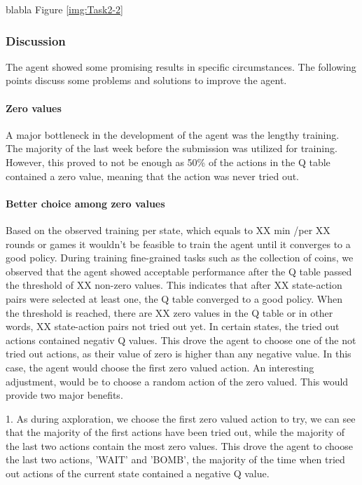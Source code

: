 \documentclass[
	letterpaper, %
	12pt, %
]{CSUniSchoolLabReport}
\begin{document}
blabla Figure \ref{img:Task2-2}

\subsubsection{Discussion}
The agent showed some promising results in specific circumstances. The following points discuss
some problems and solutions to improve the agent.

\paragraph*{Zero values}
A major bottleneck in the development of the agent was the lengthy training. The majority of
the last week before the submission was utilized for training. However, this proved to not be enough as 50\%
of the actions in the Q table contained a zero value, meaning that the action was never tried out.

\paragraph*{Better choice among zero values}
Based on the observed training per state, which equals to XX min /per XX rounds or games it wouldn't
be feasible to train the agent until it converges to a good policy. During training fine-grained
tasks such as the collection of coins, we observed that the agent showed acceptable performance
after the Q table passed the threshold of XX non-zero values. This indicates that after XX state-action pairs
were selected at least one, the Q table converged to a good policy.
When the threshold is reached, there are XX zero values in the Q table or in other words, XX state-action pairs not
tried out yet. In certain states, the tried out actions contained negativ Q values. This drove the agent to
choose one of the not tried out actions, as their value of zero is higher than any negative value.
In this case, the agent would choose the first zero valued action. An interesting adjustment, would
be to choose a random action of the zero valued. This would provide two major benefits.

1. As during axploration, we choose the first zero valued action to try, we can see that the
majority of the first actions have been tried out, while the majority of the last two actions contain the most zero values.
This drove the agent to choose the last two actions, 'WAIT' and 'BOMB', the majority of the time
when tried out actions of the current state contained a negative Q value.
\end{document}
